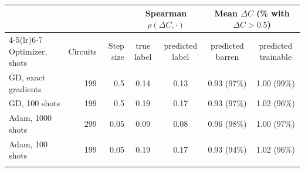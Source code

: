 \begin{tabular}{lrrcccc}
\toprule
 & & & \multicolumn{2}{c}{Spearman $\rho(\Delta C,\cdot)$} & \multicolumn{2}{c}{Mean $\Delta C$ (\% with $\Delta C>0.5$)} \\
\cmidrule(lr){4-5}\cmidrule(lr){6-7}
Optimizer, shots & Circuits & Step size & true label & predicted label & predicted barren & predicted trainable \\
\midrule
GD, exact gradients & 199 & 0.5 & 0.14 & 0.13 & 0.93 (97\%) & 1.00 (99\%) \\
GD, 100 shots & 199 & 0.5 & 0.19 & 0.17 & 0.93 (97\%) & 1.02 (96\%) \\
Adam, 1000 shots & 299 & 0.05 & 0.09 & 0.08 & 0.96 (98\%) & 1.00 (97\%) \\
Adam, 100 shots & 199 & 0.05 & 0.19 & 0.17 & 0.93 (94\%) & 1.02 (96\%) \\
\botrule
\end{tabular}
